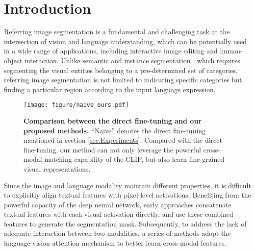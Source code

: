 \documentclass[10pt,twocolumn,letterpaper]{article}
\begin{document}
\section{Introduction}\label{sec:Introduction}
Referring image segmentation \cite{hu2016segmentation,yu2018mattnet,ye2019cross} is a fundamental and challenging task at the intersection of vision and language understanding,
which can be potentially used in a wide range of applications, including interactive image editing and human-object interaction.
Unlike semantic and instance segmentation \cite{fu2019dual,he2019adaptive,wu2020ginet,he2017mask}, which requires segmenting the visual entities belonging to a pre-determined set of categories,
referring image segmentation is not limited to indicating specific categories but finding a particular region according to the input language expression.

\begin{figure*}[t]
    \begin{center}
        \texttt{[image: figure/naive\_ours.pdf]}
\caption{\textbf{Comparison between the direct fine-tuning and our proposed methods.}
                 ``Naive'' denotes the direct fine-tuning mentioned in section \ref{sec:Experiments}.
                 Compared with the direct fine-tuning,
                 our method can not only leverage the powerful cross-modal matching capability of the CLIP,
                 but also learn fine-grained visual representations.}
    \label{fig:compare}
    \end{center}
    \vspace{-7.0mm}
\end{figure*}

Since the image and language modality maintain different properties, it is difficult to explicitly align textual features with pixel-level activations.
Benefiting from the powerful capacity of the deep neural network, early approaches \cite{hu2016segmentation,liu2017recurrent,li2018referring,margffoy2018dynamic} concatenate textual features with each visual activation directly, and use these combined features to generate the segmentation mask.
Subsequently, to address the lack of adequate interaction between two modalities, a series of methods \cite{chen2019referring,shi2018key,ye2019cross,huang2020referring,huilinguistic} adopt the language-vision attention mechanism to better learn cross-modal features.
\end{document}
